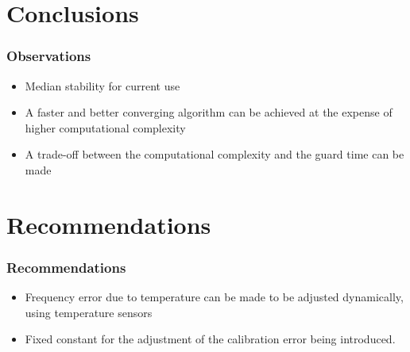 \documentclass[t]{beamer}
\begin{document}
\section{Conclusions}
\begin{frame}
\frametitle{Observations}
\begin{itemize}
\item Median stability for current use \newline
\item A faster and better converging algorithm can be achieved at the expense of higher computational complexity \newline
\item A trade-off between the computational complexity and the guard
time can be made \newline
\end{itemize}
\end{frame}
\section{Recommendations}

\begin{frame}
    \frametitle{Recommendations}
    \begin{itemize}
    \item Frequency error due to temperature can be made to be adjusted dynamically, using temperature sensors  \newline
    \item Fixed constant for the adjustment of the calibration error
    being introduced.
    \end{itemize}
\end{frame}
\end{document}

